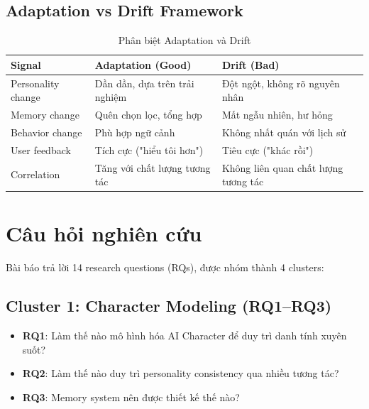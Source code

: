 \documentclass[10pt,leqno]{amsart}
\begin{document}
\subsection{Adaptation vs Drift Framework}

\begin{table}[H]
\centering
\caption{Phân biệt Adaptation và Drift}
\label{tab:adaptation-drift}
\begin{tabular}{lll}
\toprule
\textbf{Signal} & \textbf{Adaptation (Good)} & \textbf{Drift (Bad)} \\
\midrule
Personality change & Dần dần, dựa trên trải nghiệm & Đột ngột, không rõ nguyên nhân \\
Memory change & Quên chọn lọc, tổng hợp & Mất ngẫu nhiên, hư hỏng \\
Behavior change & Phù hợp ngữ cảnh & Không nhất quán với lịch sử \\
User feedback & Tích cực ("hiểu tôi hơn") & Tiêu cực ("khác rồi") \\
Correlation & Tăng với chất lượng tương tác & Không liên quan chất lượng tương tác \\
\bottomrule
\end{tabular}
\end{table}


\section{Câu hỏi nghiên cứu}

Bài báo trả lời 14 research questions (RQs), được nhóm thành 4 clusters:

\subsection{Cluster 1: Character Modeling (RQ1--RQ3)}
\begin{itemize}
    \item \textbf{RQ1}: Làm thế nào mô hình hóa AI Character để duy trì danh tính xuyên suốt?
    \item \textbf{RQ2}: Làm thế nào duy trì personality consistency qua nhiều tương tác?
    \item \textbf{RQ3}: Memory system nên được thiết kế thế nào?
\end{itemize}
\end{document}
